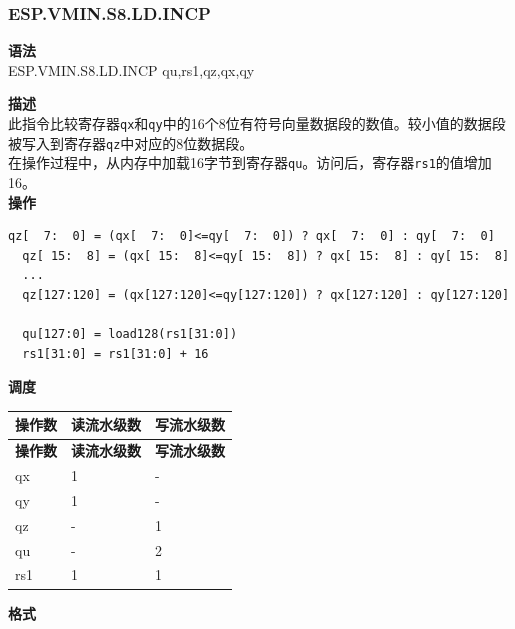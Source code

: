 \newpage
\subsubsection{ESP.VMIN.S8.LD.INCP}\label{instruction:ESPVMINS8LDINCP}
\textbf{语法}\\
ESP.VMIN.S8.LD.INCP qu,rs1,qz,qx,qy

\textbf{描述}\\
此指令比较寄存器\lstinline{qx}和\lstinline{qy}中的16个8位有符号向量数据段的数值。较小值的数据段被写入到寄存器\lstinline{qz}中对应的8位数据段。\\在操作过程中，从内存中加载16字节到寄存器\lstinline{qu}。访问后，寄存器\lstinline{rs1}的值增加16。\\
\textbf{操作}
\begin{lstlisting}[escapeinside=`?]
  qz[  7:  0] = (qx[  7:  0]<=qy[  7:  0]) ? qx[  7:  0] : qy[  7:  0]
  qz[ 15:  8] = (qx[ 15:  8]<=qy[ 15:  8]) ? qx[ 15:  8] : qy[ 15:  8]
  ...
  qz[127:120] = (qx[127:120]<=qy[127:120]) ? qx[127:120] : qy[127:120]

  qu[127:0] = load128(rs1[31:0])
  rs1[31:0] = rs1[31:0] + 16
\end{lstlisting}


\textbf{调度}\\
\begin{longtable}[c]{|l|l|l|}
    \hline
    \rowcolor{lightgray}
    \textbf{操作数} & \textbf{读流水级数} & \textbf{写流水级数} \\\hline
    \endfirsthead
    \hline
    \rowcolor{lightgray}
     \textbf{操作数} & \textbf{读流水级数} & \textbf{写流水级数} \\\hline
    \endhead
    \hline
    \endfoot

    qx & 1 & - \\\hline
  qy & 1 & - \\\hline
     qz & - & 1 \\\hline
     qu & - & 2 \\\hline
     rs1 & 1 & 1

\end{longtable}

\textbf{格式}\\

